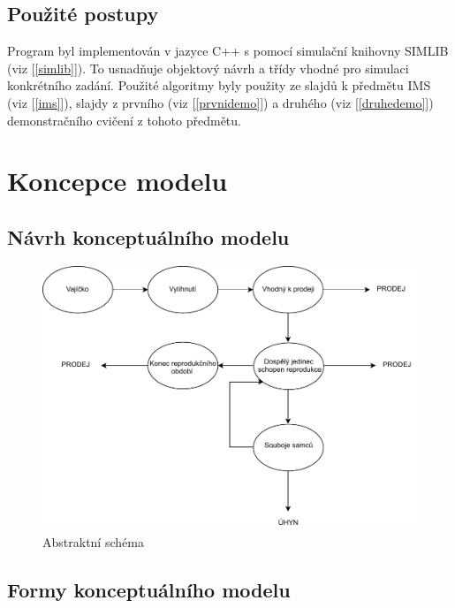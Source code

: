 \documentclass[11pt, a4paper, titlepage]{article}
\begin{document}
    \subsection{Použité postupy}
    Program byl implementován v jazyce C++ s pomocí simulační knihovny SIMLIB (viz [\ref{simlib}]). To usnadňuje objektový návrh
    a třídy vhodné pro simulaci konkrétního zadání. Použité algoritmy byly použity ze slajdů k předmětu IMS (viz [\ref{ims}]), slajdy
    z prvního (viz [\ref{prvnidemo}]) a druhého (viz [\ref{druhedemo}]) demonstračního cvičení z tohoto předmětu.



    \section{Koncepce modelu}

    \subsection{Návrh konceptuálního modelu}

    \begin{figure}[H]
        \begin{center}
            \includegraphics[scale=0.7]{./assets/abstraktni_model.pdf}
            \caption{Abstraktní schéma}
        \end{center}
    \end{figure}

    \subsection{Formy konceptuálního modelu}
\end{document}
